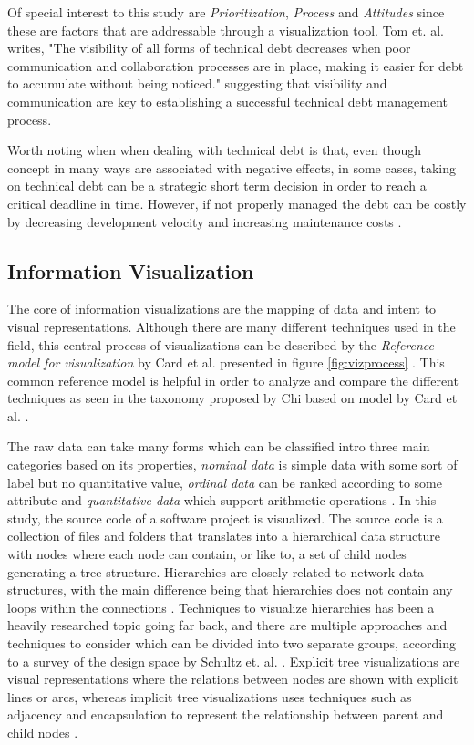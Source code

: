 Of special interest to this study are \textit{Prioritization}, \textit{Process} and \textit{Attitudes} since these are factors that are addressable through a visualization tool.
Tom et. al. writes, "The visibility of all forms of technical debt decreases when poor communication and collaboration processes are in place, making it easier for debt to accumulate without being noticed." \cite{tom_exploration_2013} suggesting that visibility and communication are key to establishing a successful technical debt management process.

Worth noting when when dealing with technical debt is that, even though concept in many ways are associated with negative effects, in some cases, taking on technical debt can be a strategic short term decision in order to reach a critical deadline in time.
However, if not properly managed the debt can be costly by decreasing development velocity and increasing maintenance costs \cite{seaman_using_2012}.

\subsection{Information Visualization}

The core of information visualizations are the mapping of data and intent to visual representations.
Although there are many different techniques used in the field, this central process of visualizations can be described by the \textit{Reference model for visualization} by Card et al. presented in figure \ref{fig:vizprocess} \cite{card_readings_1999}. 
This common reference model is helpful in order to analyze and compare the different techniques as seen in the taxonomy proposed by Chi based on model by Card et al. \cite{chi_taxonomy_2000}.



The raw data can take many forms which can be classified intro three main categories based on its properties, \textit{nominal data} is simple data with some sort of label but no quantitative value, \textit{ordinal data} can be ranked according to some attribute and \textit{quantitative data} which support arithmetic operations \cite{card_structure_1997}.
In this study, the source code of a software project is visualized.
The source code is a collection of files and folders that translates into a hierarchical data structure with nodes where each node can contain, or like to, a set of child nodes generating a tree-structure.
Hierarchies are closely related to network data structures, with the main difference being that hierarchies does not contain any loops within the connections \cite{spence_information_2014}.
Techniques to visualize hierarchies has been a heavily researched topic going far back, and there are multiple approaches and techniques to consider which can be divided into two separate groups, according to a survey of the design space by Schultz et. al. \cite{schulz_design_2011}. 
Explicit tree visualizations are visual representations where the relations between nodes are shown with explicit lines or arcs, whereas implicit tree visualizations uses techniques such as adjacency and encapsulation to represent the relationship between parent and child nodes \cite{schulz_design_2011}.